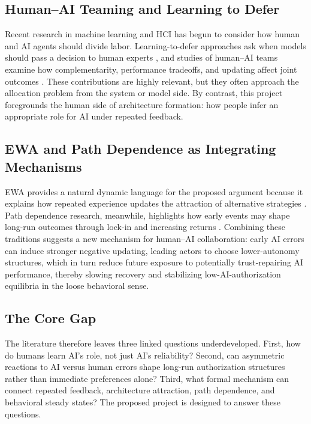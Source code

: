 \subsection{Human--AI Teaming and Learning to Defer}

Recent research in machine learning and HCI has begun to consider how human and AI agents should divide labor. Learning-to-defer approaches ask when models should pass a decision to human experts \citep{mozannar2020defer}, and studies of human--AI teams examine how complementarity, performance tradeoffs, and updating affect joint outcomes \citep{bansal2019updates,vaccaro2024combinations}. These contributions are highly relevant, but they often approach the allocation problem from the system or model side. By contrast, this project foregrounds the human side of architecture formation: how people infer an appropriate role for AI under repeated feedback.

\subsection{EWA and Path Dependence as Integrating Mechanisms}

EWA provides a natural dynamic language for the proposed argument because it explains how repeated experience updates the attraction of alternative strategies \citep{camerer1999ewa}. Path dependence research, meanwhile, highlights how early events may shape long-run outcomes through lock-in and increasing returns \citep{david1985qwerty,arthur1989lockin}. Combining these traditions suggests a new mechanism for human--AI collaboration: early AI errors can induce stronger negative updating, leading actors to choose lower-autonomy structures, which in turn reduce future exposure to potentially trust-repairing AI performance, thereby slowing recovery and stabilizing low-AI-authorization equilibria in the loose behavioral sense.

\subsection{The Core Gap}

The literature therefore leaves three linked questions underdeveloped. First, how do humans learn AI's role, not just AI's reliability? Second, can asymmetric reactions to AI versus human errors shape long-run authorization structures rather than immediate preferences alone? Third, what formal mechanism can connect repeated feedback, architecture attraction, path dependence, and behavioral steady states? The proposed project is designed to answer these questions.
